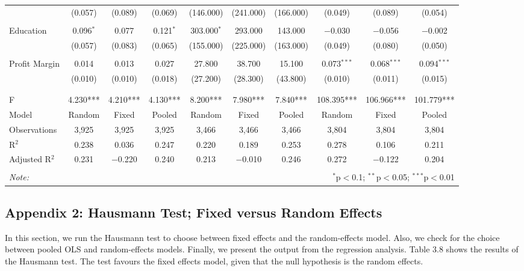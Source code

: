 \documentclass[a4paper, nobind]{templates/ociamthesis}
\begin{document}
\begin{landscape}
\begin{table}[!htbp]
\begin{tabular}{@{\extracolsep{5pt}}lccccccccc}
  & (0.057) & (0.089) & (0.069) & (146.000) & (241.000) & (166.000) & (0.049) & (0.089) & (0.054) \\ 
  & & & & & & & & & \\ 
 Education & 0.096$^{*}$ & 0.077 & 0.121$^{*}$ & 303.000$^{*}$ & 293.000 & 143.000 & $-$0.030 & $-$0.056 & $-$0.002 \\ 
  & (0.057) & (0.083) & (0.065) & (155.000) & (225.000) & (163.000) & (0.049) & (0.080) & (0.050) \\ 
  & & & & & & & & & \\ 
 Profit Margin & 0.014 & 0.013 & 0.027 & 27.800 & 38.700 & 15.100 & 0.073$^{***}$ & 0.068$^{***}$ & 0.094$^{***}$ \\ 
  & (0.010) & (0.010) & (0.018) & (27.200) & (28.300) & (43.800) & (0.010) & (0.011) & (0.015) \\ 
  & & & & & & & & & \\ 
\hline \\[-1.8ex] 
F & 4.230*** & 4.210*** & 4.130*** & 8.200*** & 7.980*** & 7.840*** & 108.395*** & 106.966*** & 101.779*** \\ 
Model & Random & Fixed & Pooled & Random & Fixed & Pooled & Random & Fixed & Pooled \\ 
Observations & 3,925 & 3,925 & 3,925 & 3,466 & 3,466 & 3,466 & 3,804 & 3,804 & 3,804 \\ 
R$^{2}$ & 0.238 & 0.036 & 0.247 & 0.220 & 0.189 & 0.253 & 0.278 & 0.106 & 0.211 \\ 
Adjusted R$^{2}$ & 0.231 & $-$0.220 & 0.240 & 0.213 & $-$0.010 & 0.246 & 0.272 & $-$0.122 & 0.204 \\ 
\hline 
\hline \\[-1.8ex] 
\textit{Note:}  & \multicolumn{9}{r}{$^{*}$p$<$0.1; $^{**}$p$<$0.05; $^{***}$p$<$0.01} \\ 
\end{tabular} 
\end{table}

\end{landscape}
\newpage

\hypertarget{appendix-2-hausmann-test-fixed-versus-random-effects}{%
\subsection{Appendix 2: Hausmann Test; Fixed versus Random Effects}\label{appendix-2-hausmann-test-fixed-versus-random-effects}}

In this section, we run the Hausmann test to choose between fixed effects and the random-effects model. Also, we check for the choice between pooled OLS and random-effects models. Finally, we present the output from the regression analysis. Table 3.8 shows the results of the Hausmann test. The test favours the fixed effects model, given that the null hypothesis is the random effects.
\end{document}
